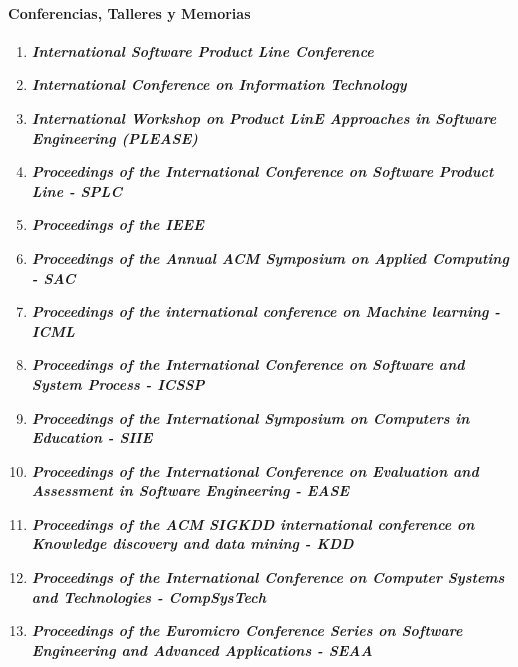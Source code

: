 \paragraph{Conferencias, Talleres y Memorias}
\begin{enumerate}

\item \textbf{\textit{International Software Product Line Conference}}
\item \textbf{\textit{International Conference on Information Technology}}
\item \textbf{\textit{International Workshop on Product LinE Approaches in Software Engineering (PLEASE)}}
\item \textbf{\textit{Proceedings of the International Conference on Software Product Line - SPLC}}
\item \textbf{\textit{Proceedings of the IEEE}}
\item \textbf{\textit{Proceedings of the Annual ACM Symposium on Applied Computing - SAC}}
\item \textbf{\textit{Proceedings of the international conference on Machine learning - ICML}}
\item \textbf{\textit{Proceedings of the International Conference on Software and System Process - ICSSP}}
\item \textbf{\textit{Proceedings of the International Symposium on Computers in Education - SIIE}}
\item \textbf{\textit{Proceedings of the International Conference on Evaluation and Assessment in Software Engineering - EASE}}
\item \textbf{\textit{Proceedings of the ACM SIGKDD international conference on Knowledge discovery and data mining - KDD}}
\item \textbf{\textit{Proceedings of the International Conference on Computer Systems and Technologies - CompSysTech}}
\item \textbf{\textit{Proceedings of the Euromicro Conference Series on Software Engineering and Advanced Applications - SEAA}}

\end{enumerate}

